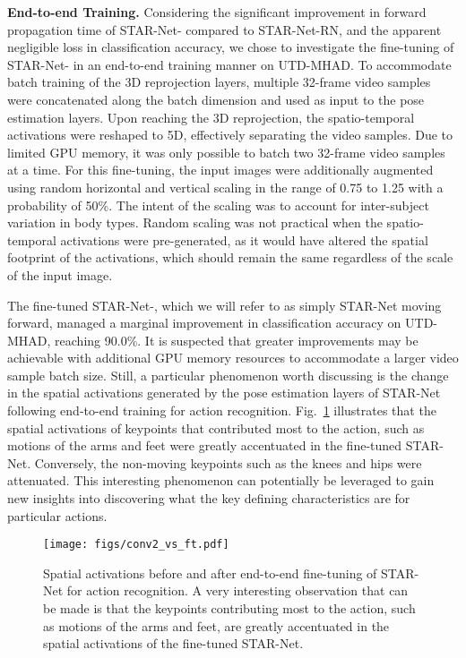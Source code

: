 \documentclass[10pt, conference, compsocconf]{IEEEtran}
\begin{document}
\smallskip\noindent\textbf{End-to-end Training.} Considering the significant improvement in forward propagation time of STAR-Net- compared to STAR-Net-RN, and the apparent negligible loss in classification accuracy, we chose to investigate the fine-tuning of STAR-Net- in an end-to-end training manner on UTD-MHAD. To accommodate batch training of the 3D reprojection layers, multiple 32-frame video samples were concatenated along the batch dimension and used as input to the pose estimation layers. Upon reaching the 3D reprojection, the spatio-temporal activations were reshaped to 5D, effectively separating the video samples. Due to limited GPU memory, it was only possible to batch two 32-frame video samples at a time. For this fine-tuning, the input images were additionally augmented using random horizontal and vertical scaling in the range of 0.75 to 1.25 with a probability of 50\%. The intent of the scaling was to account for inter-subject variation in body types. Random scaling was not practical when the spatio-temporal activations were pre-generated, as it would have altered the spatial footprint of the activations, which should remain the same regardless of the scale of the input image.



The fine-tuned STAR-Net-, which we will refer to as simply STAR-Net moving forward, managed a marginal improvement in classification accuracy on UTD-MHAD, reaching 90.0\%. It is suspected that greater improvements may be achievable with additional GPU memory resources to accommodate a larger video sample batch size. Still, a particular phenomenon worth discussing is the change in the spatial activations generated by the pose estimation layers of STAR-Net following end-to-end training for action recognition. Fig.~\ref{fig:conv2_vs_starnet} illustrates that the spatial activations of keypoints that contributed most to the action, such as motions of the arms and feet were greatly accentuated in the fine-tuned STAR-Net. Conversely, the non-moving keypoints such as the knees and hips were attenuated. This interesting phenomenon can potentially be leveraged to gain new insights into discovering what the key defining characteristics are for particular actions.

\begin{figure}
    \centering
    \texttt{[image: figs/conv2\_vs\_ft.pdf]}
    \vspace{-15pt}
\caption{Spatial activations before and after end-to-end fine-tuning of STAR-Net for action recognition. A very interesting observation that can be made is that the keypoints contributing most to the action, such as motions of the arms and feet, are greatly accentuated in the spatial activations of the fine-tuned STAR-Net.}
    \label{fig:conv2_vs_starnet}
    \vspace{-5pt}
\end{figure}
\end{document}
